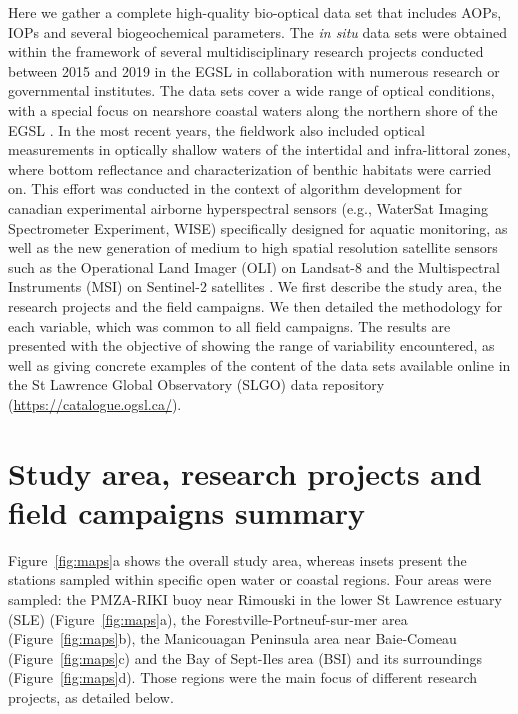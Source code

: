 \documentclass[essd, manuscript]{copernicus}
\begin{document}
Here we gather a complete high-quality bio-optical data set that includes AOPs, IOPs and several biogeochemical parameters. The \textit{in situ} data sets were obtained within the framework of several multidisciplinary research projects conducted between 2015 and 2019 in the EGSL in collaboration with numerous research or governmental institutes. The data sets cover a wide range of optical conditions, with a special focus on nearshore coastal waters along the northern shore of the EGSL \citep[e.g.,][]{Araujo2022a}. In the most recent years, the fieldwork also included optical measurements in optically shallow waters of the intertidal and infra-littoral zones, where bottom reflectance and characterization of benthic habitats were carried on. This effort was conducted in the context of algorithm development for canadian experimental airborne hyperspectral sensors (e.g., WaterSat Imaging Spectrometer Experiment, WISE) specifically designed for aquatic monitoring, as well as the new generation of medium to high spatial resolution satellite sensors such as the Operational Land Imager (OLI) on Landsat-8 and the Multispectral Instruments (MSI) on Sentinel-2 satellites \citep[e.g.,][]{Mabit2022, Araujo2022b}. We first describe the study area, the research projects and the field campaigns. We then detailed the methodology for each variable, which was common to all field campaigns. The results are presented with the objective of showing the range of variability encountered, as well as giving concrete examples of the content of the data sets available online in the St Lawrence Global Observatory (SLGO) data repository (\url{https://catalogue.ogsl.ca/}). 



\section{Study area, research projects and field campaigns summary}
Figure~\ref{fig:maps}a shows the overall study area, whereas insets present the stations sampled  within specific open water or coastal regions. Four areas were sampled: the PMZA-RIKI buoy near Rimouski in the lower St Lawrence estuary (SLE) (Figure~\ref{fig:maps}a), the Forestville-Portneuf-sur-mer area (Figure~\ref{fig:maps}b), the Manicouagan Peninsula area near Baie-Comeau (Figure~\ref{fig:maps}c) and the Bay of Sept-Iles area (BSI) and its surroundings (Figure~\ref{fig:maps}d). Those regions were the main focus of different research projects, as detailed below.
\end{document}
